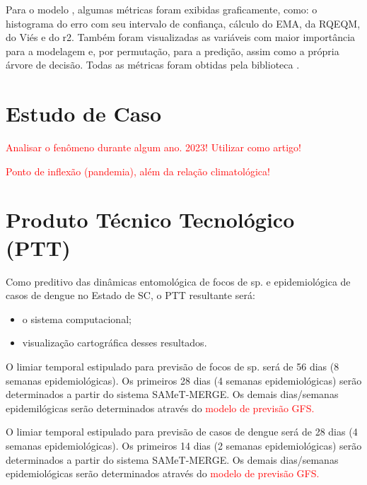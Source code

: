 \documentclass[
	12pt,				%
	openright,			%
	oneside,			%
	a4paper,			%
	english,			%
	french,				%
	spanish,			%
	brazil				%
	dvipsnames, table]{abntex2}
\begin{document}
\indent Para o modelo , algumas métricas foram exibidas graficamente, como: o histograma do erro com seu intervalo de confiança, cálculo do \acrfull{EMA}, da \acrfull{RQEQM}, do Viés e do \acrfull{r2}. Também foram visualizadas as variáveis com maior importância para a modelagem e, por permutação, para a predição, assim como a própria árvore de decisão. Todas as métricas foram obtidas pela biblioteca .

\section{Estudo de Caso}

\indent \textcolor{red}{Analisar o fenômeno durante algum ano. 2023! Utilizar como artigo!}

\indent \textcolor{red}{Ponto de inflexão (pandemia), além da relação climatológica!}

\section{Produto Técnico Tecnológico (PTT)}

\indent Como preditivo das dinâmicas entomológica de focos de  sp. e epidemiológica de casos de dengue no Estado de \acrlong{SC}, o \acrshort{PTT} resultante será:

\begin{itemize}
  \item o sistema computacional;
  \item visualização cartográfica desses resultados.
\end{itemize}

\indent O limiar temporal estipulado para previsão de focos de  sp. será de 56 dias (8 semanas epidemiológicas). Os primeiros 28 dias (4 semanas epidemiológicas) serão determinados a partir do sistema \acrshort{SAMeT}-\acrshort{MERGE}. Os demais dias/semanas epidemilógicas serão determinados através do \textcolor{red}{modelo de previsão \acrshort{GFS}.}

\indent O limiar temporal estipulado para previsão de casos de dengue será de 28 dias (4 semanas epidemiológicas). Os primeiros 14 dias (2 semanas epidemiológicas) serão determinados a partir do sistema \acrshort{SAMeT}-\acrshort{MERGE}. Os demais dias/semanas epidemiológicas serão determinados através do \textcolor{red}{modelo de previsão \acrshort{GFS}.}


\end{document}
